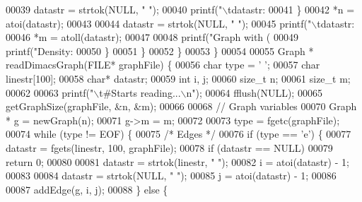 \begin{DoxyCode}
{{00039                                         datastr = strtok(NULL, \textcolor{stringliteral}{" "});
00040                                         printf(\textcolor{stringliteral}{"\(\backslash\)tdatastr:%
00041                                 \}
00042                                 *n = atoi(datastr);
00043 
00044                                 datastr = strtok(NULL, \textcolor{stringliteral}{" "});
00045                                 printf(\textcolor{stringliteral}{"\(\backslash\)tdatastr:%
00046                                 *m = atoll(datastr);
00047 
00048                                 printf(\textcolor{stringliteral}{"Graph with (%
00049                                 printf(\textcolor{stringliteral}{"Density: %
00050                         \}
00051                 \}
00052         \}
00053 \}
00054 
00055 Graph * readDimacsGraph(FILE* graphFile) \{
00056         \textcolor{keywordtype}{char} type = \textcolor{charliteral}{' '};
00057         \textcolor{keywordtype}{char} linestr[100];
00058         \textcolor{keywordtype}{char}* datastr;
00059         \textcolor{keywordtype}{int} i, j;
00060         \textcolor{keywordtype}{size\_t} n;
00061         \textcolor{keywordtype}{size\_t} m;
00062 
00063         printf(\textcolor{stringliteral}{"\(\backslash\)t#Starts reading...\(\backslash\)n"});
00064         fflush(NULL);
00065         getGraphSize(graphFile, &n, &m);
00066 
00068         \textcolor{comment}{// Graph variables}
00070 \textcolor{comment}{}        Graph * g = newGraph(n);
00071         g->m = m;
00072 
00073         type = fgetc(graphFile);
00074         \textcolor{keywordflow}{while} (type != EOF) \{
00075                 \textcolor{comment}{/* Edges */}
00076                 \textcolor{keywordflow}{if} (type == \textcolor{charliteral}{'e'}) \{
00077                         datastr = fgets(linestr, 100, graphFile);
00078                         \textcolor{keywordflow}{if} (datastr == NULL)
00079                                 \textcolor{keywordflow}{return} 0;
00080 
00081                         datastr = strtok(linestr, \textcolor{stringliteral}{" "});
00082                         i = atoi(datastr) - 1;
00083 
00084                         datastr = strtok(NULL, \textcolor{stringliteral}{" "});
00085                         j = atoi(datastr) - 1;
00086 
00087                         addEdge(g, i, j);
00088                 \} \textcolor{keywordflow}{else} \{
}}}}}}
\end{DoxyCode}
